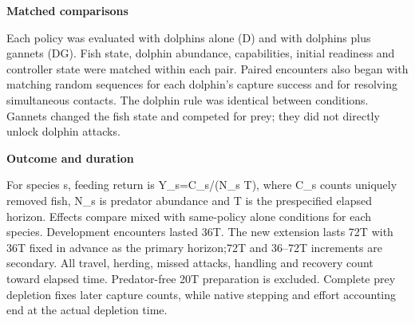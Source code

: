 \documentclass[10pt,a4paper]{article}
\begin{document}
\begin{minipage}[t]{238.10999999999999pt}\vspace{0pt}
\textbf{Matched comparisons}\par Each policy was evaluated with dolphins alone (D) and with dolphins plus gannets (DG). Fish state, dolphin abundance, capabilities, initial readiness and controller state were matched within each pair. Paired encounters also began with matching random sequences for each dolphin's capture success and for resolving simultaneous contacts. The dolphin rule was identical between conditions. Gannets changed the fish state and competed for prey; they did not directly unlock dolphin attacks.\par\smallskip
\textbf{Outcome and duration}\par For species s, feeding return is Y\_s=C\_s/(N\_s T), where C\_s counts uniquely removed fish, N\_s is predator abundance and T is the prespecified elapsed horizon. Effects compare mixed with same-policy alone conditions for each species. Development encounters lasted 36T. The new extension lasts 72T with 36T fixed in advance as the primary horizon;72T and 36--72T increments are secondary. All travel, herding, missed attacks, handling and recovery count toward elapsed time. Predator-free 20T preparation is excluded. Complete prey depletion fixes later capture counts, while native stepping and effort accounting end at the actual depletion time.\par\smallskip
\end{minipage}
\hfill
\end{document}
